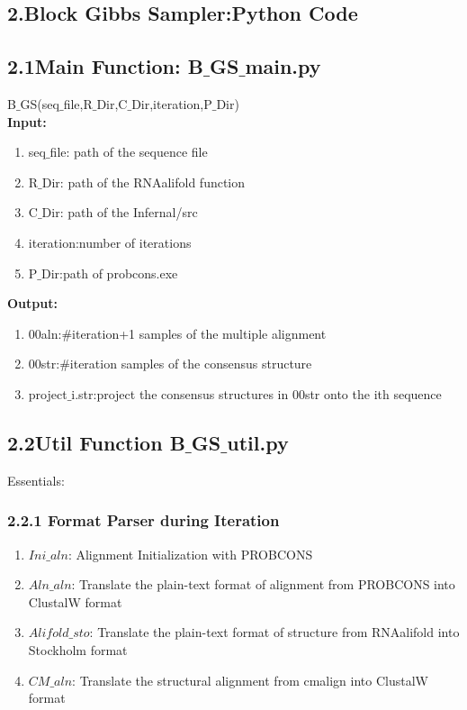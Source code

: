 \documentclass{article}
\begin{document}
\begin{spacing}{1.1}
\section{2.Block Gibbs Sampler:Python Code}
\subsection{2.1{\bf Main Function:} B$\_$GS$\_$main.py}
B$\_$GS(seq$\_$file,R$\_$Dir,C$\_$Dir,iteration,P$\_$Dir)\\
{\bf Input:} 
\begin{enumerate}
 \item seq$\_$file: path of the sequence file
 \item R$\_$Dir: path of the RNAalifold function
 \item C$\_$Dir: path of the Infernal/src
 \item iteration:number of iterations
 \item P$\_$Dir:path of probcons.exe
\end{enumerate}
{\bf Output:}
\begin{enumerate}
 \item 00aln:$\#$iteration+1 samples of the multiple alignment
 \item 00str:$\#$iteration samples of the consensus structure
 \item project$\_$i.str:project the consensus structures in 00str onto the ith sequence 
\end{enumerate}

\subsection{2.2{\bf Util Function} B$\_$GS$\_$util.py}
Essentials:
\subsubsection{2.2.1 Format Parser during Iteration}
\begin{enumerate}
 \item $Ini\_aln$: Alignment Initialization with PROBCONS
 \item $Aln\_aln$: Translate the plain-text format of alignment from PROBCONS into ClustalW format
 \item $Alifold\_sto$: Translate the plain-text format of structure from RNAalifold into Stockholm format
 \item $CM\_aln$: Translate the structural alignment from cmalign into ClustalW format
\end{enumerate}

\end{spacing}
\end{document}
